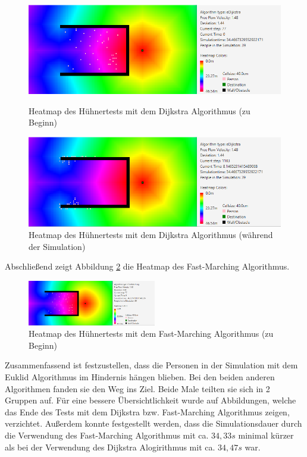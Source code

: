 \begin{figure}[!htb]
	\centering
	\begin{minipage}{.5\textwidth}
		\centering
		\includegraphics[width=\textwidth]{abbildungen/ChickenTestBeginDijkstra.png}
		\caption{Heatmap des Hühnertests mit dem Dijkstra Algorithmus (zu Beginn)}
		\label{fig:HühnerTestDijkstraAnfang}
	\end{minipage}%
	\begin{minipage}{0.5\textwidth}
		\centering
		\includegraphics[width=\textwidth]{abbildungen/ChickenTestMitteDijkstra.png}
		\caption{Heatmap des Hühnertests mit dem Dijkstra Algorithmus (während der Simulation)}
		\label{fig:HühnertestDijkstraMitte}
	\end{minipage}
\end{figure}

Abschließend zeigt Abbildung \ref{fig:HühnertestFMAnfang} die Heatmap des Fast-Marching Algorithmus. 

\begin{figure}[htpb]
	\centering
	\includegraphics[width=0.5\textwidth]{abbildungen/ChickenTestBeginFM.png}
	\caption{Heatmap des Hühnertests mit dem Fast-Marching Algorithmus (zu Beginn)}
	\label{fig:HühnertestFMAnfang}
\end{figure}

Zusammenfassend ist festzustellen, dass die Personen in der Simulation mit dem Euklid Algorithmus im Hindernis hängen blieben. Bei den beiden anderen Algorithmen fanden sie den Weg ins Ziel. Beide Male teilten sie sich in 2 Gruppen auf. Für eine bessere Übersichtlichkeit wurde auf Abbildungen, welche das Ende des Tests mit dem Dijkstra bzw. Fast-Marching Algorithmus zeigen, verzichtet. Außerdem konnte festgestellt werden, dass die Simulationsdauer durch die Verwendung des Fast-Marching Algorithmus mit ca. $34,33s$ minimal kürzer als bei der Verwendung des Dijkstra Alogirithmus mit ca. $34,47s$ war.

